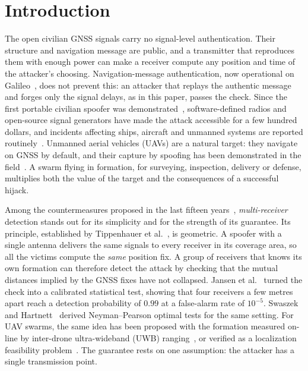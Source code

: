 \documentclass[conference]{IEEEtran}
\begin{document}
\section{Introduction}
\label{sec:intro}

The open civilian GNSS signals carry no signal-level authentication.
Their structure and navigation message are public, and a transmitter
that reproduces them with enough power can make a receiver compute any
position and time of the attacker's choosing. Navigation-message
authentication, now operational on Galileo~\cite{euspa2025osnma}, does
not prevent this: an attacker that replays the authentic message and
forges only the signal delays, as in this paper, passes the check. Since
the first portable civilian spoofer was
demonstrated~\cite{humphreys2008assessing}, software-defined radios and
open-source signal generators have made the attack accessible for a few
hundred dollars, and incidents affecting ships, aircraft and unmanned
systems are reported routinely~\cite{psiaki2016gnss}. Unmanned aerial
vehicles (UAVs) are a natural target: they navigate on GNSS by default,
and their capture by spoofing has been demonstrated in the
field~\cite{kerns2014capture}. A swarm flying in formation, for
surveying, inspection, delivery or defense, multiplies both the value of
the target and the consequences of a successful hijack.

Among the countermeasures proposed in the last fifteen
years~\cite{psiaki2016gnss,altaweel2023fanets}, \emph{multi-receiver}
detection stands out for its simplicity and for the strength of its
guarantee. Its principle, established by Tippenhauer et
al.~\cite{tippenhauer2011requirements}, is geometric. A spoofer with a
single antenna delivers the same signals to every receiver in its
coverage area, so all the victims compute the \emph{same} position fix.
A group of receivers that knows its own formation can therefore detect
the attack by checking that the mutual distances implied by the GNSS
fixes have not collapsed. Jansen et al.~\cite{jansen2016multireceiver}
turned the check into a calibrated statistical test, showing that four
receivers a few metres apart reach a detection probability of $0.99$ at
a false-alarm rate of $10^{-5}$. Swaszek and
Hartnett~\cite{swaszek2013multicots} derived Neyman--Pearson optimal
tests for the same setting. For UAV swarms, the same idea has been
proposed with the formation measured on-line by inter-drone
ultra-wideband (UWB) ranging~\cite{mykytyn2023uwb}, or verified as a
localization feasibility problem~\cite{bi2024sdp}. The guarantee rests
on one assumption: the attacker has a single transmission point.
\end{document}
